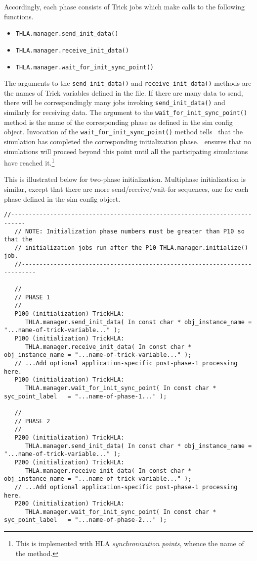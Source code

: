 Accordingly, each phase consists of Trick jobs which make calls to
the following functions.

\begin{itemize}
\item{{\tt THLA.manager.send\_init\_data()}}
\item{{\tt THLA.manager.receive\_init\_data()}}
\item{{\tt THLA.manager.wait\_for\_init\_sync\_point()}}
\end{itemize}

The arguments to the {\tt send\_init\_data()} and {\tt receive\_init\_data()}
methods are the names of Trick variables defined in the \sdefine file.
If there are many data to send, there will be correspondingly many
jobs invoking {\tt send\_init\_data()}
and similarly for receiving data.
The argument to the {\tt wait\_for\_init\_sync\_point()} method
is the name of the corresponding phase as defined in the sim config object.
Invocation of the {\tt wait\_for\_init\_sync\_point()} method
tells \TrickHLA\ that the simulation has completed the corresponding
initialization phase.
\TrickHLA\ ensures that no simulations will proceed beyond this point
until all the participating simulations have reached it.\footnote{
  This is implemented with HLA {\em synchronization points},
  whence the name of the method.
}

This is illustrated below for two-phase initialization.
Multiphase initialization is similar, except that there are more
send/receive/wait-for sequences,
one for each phase defined in the sim config object.

\begin{lstlisting}[caption={Multiphase initialization jobs}]
   //--------------------------------------------------------------------------
   // NOTE: Initialization phase numbers must be greater than P10 so that the 
   // initialization jobs run after the P10 THLA.manager.initialize() job.
   //--------------------------------------------------------------------------

   //
   // PHASE 1
   //
   P100 (initialization) TrickHLA:
      THLA.manager.send_init_data( In const char * obj_instance_name = "...name-of-trick-variable..." );
   P100 (initialization) TrickHLA:
      THLA.manager.receive_init_data( In const char * obj_instance_name = "...name-of-trick-variable..." );
   // ...Add optional application-specific post-phase-1 processing here.
   P100 (initialization) TrickHLA:
      THLA.manager.wait_for_init_sync_point( In const char * syc_point_label   = "...name-of-phase-1..." );

   //
   // PHASE 2
   //
   P200 (initialization) TrickHLA:
      THLA.manager.send_init_data( In const char * obj_instance_name = "...name-of-trick-variable..." );
   P200 (initialization) TrickHLA:
      THLA.manager.receive_init_data( In const char * obj_instance_name = "...name-of-trick-variable..." );
   // ...Add optional application-specific post-phase-1 processing here.
   P200 (initialization) TrickHLA:
      THLA.manager.wait_for_init_sync_point( In const char * syc_point_label   = "...name-of-phase-2..." );
\end{lstlisting}

